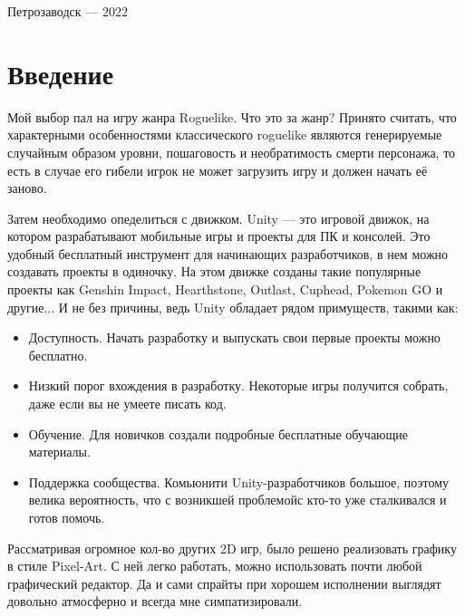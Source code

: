 \documentclass[a4paper,12pt]{article}
\begin{document}
\vfill

\begin{center}
\large
    Петрозаводск --- 2022
\end{center}




\newpage
\tableofcontents

\newpage
\section*{Введение}
\large {
Мой выбор пал на игру жанра Roguelike. Что это за жанр? Принято считать, что характерными особенностями классического roguelike являются генерируемые случайным образом уровни, пошаговость и необратимость смерти персонажа, то есть в случае его гибели игрок не может загрузить игру и должен начать её заново.

Затем необходимо опеделиться с движком. Unity — это игровой движок, на котором разрабатывают мобильные игры и проекты для ПК и консолей. Это удобный бесплатный инструмент для начинающих разработчиков, в нем можно создавать проекты в одиночку. На этом движке созданы такие популярные проекты как Genshin Impact, Hearthstone, Outlast, Cuphead, Pokemon GO и другие... И не без причины, ведь Unity обладает рядом примуществ, такими как:
\begin{itemize}
    \item Доступность. Начать разработку и выпускать свои первые проекты можно бесплатно.
    \item Низкий порог вхождения в разработку. Некоторые игры получится собрать, даже если вы не умеете писать код.
    \item Обучение. Для новичков создали подробные бесплатные обучающие материалы.
    \item Поддержка сообщества. Комьюнити Unity-разработчиков большое, поэтому велика вероятность, что с возникшей проблемойс кто-то уже сталкивался и готов помочь.
\end{itemize}

Рассматривая огромное кол-во других 2D игр, было решено реализовать графику в стиле Pixel-Art. С ней легко работать, можно использовать почти любой графический редактор. Да и сами спрайты при хорошем исполнении выглядят довольно атмосферно и всегда мне симпатизировали.
} \\ 
 \\
\end{document}
